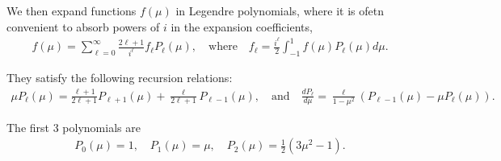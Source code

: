 We then expand functions $f(\mu)$ in Legendre polynomials, where it is ofetn convenient to absorb powers of $i$ in the expansion coefficients,
\begin{align}
    f(\mu) = \sum_{\ell=0}^{\infty} \frac{2\ell + 1}{i^\ell} f_{\ell} P_{\ell}(\mu), \quad \text{where}\quad f_{\ell} = \frac{i^\ell}{2} \int_{-1}^{1} f(\mu) P_{\ell}(\mu) d\mu.
\end{align}

They satisfy the following recursion relations:
\begin{align}
    \mu P_\ell(\mu) = \frac{\ell+1}{2\ell + 1} P_{\ell+1}(\mu) + \frac{\ell}{2\ell + 1} P_{\ell-1}(\mu), \quad \text{and}\quad \frac{dP_\ell}{d\mu} = \frac{\ell}{1-\mu^2} (P_{\ell-1}(\mu) - \mu P_\ell(\mu)).
\end{align}

The first 3 polynomials are
\begin{align}
    P_0(\mu) = 1, \quad P_1(\mu) = \mu, \quad P_2(\mu) = \frac{1}{2}(3\mu^2 - 1).
\end{align}